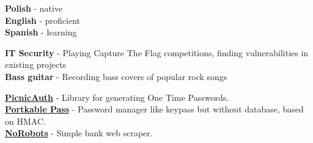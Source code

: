 \documentclass[9pt]{developercv} %
\begin{document}
\begin{minipage}[t]{0.2\textwidth}
	\vspace{-\baselineskip} %


	\textbf{Polish} - native\\
	\textbf{English} - proficient\\
	\textbf{Spanish} - learning
\end{minipage}
\hfill
\begin{minipage}[t]{0.3\textwidth}
	\vspace{-\baselineskip} %


	\textbf{IT Security} - Playing Capture The Flag competitions, finding vulnerabilities in existing projects\\
	\textbf{Bass guitar} - Recording bass covers of popular rock songs
\end{minipage}
\hfill
\begin{minipage}[t]{0.4\textwidth}
	\vspace{-\baselineskip} %


	\textbf{\href{https://github.com/matishadow/PicnicAuth}{PicnicAuth}} - Library for generating One Time Passwords.\\
	\textbf{\href{https://github.com/matishadow/portkable-pass}{Portkable Pass}} - Password manager like keypass but without database, based on HMAC.\\
	\textbf{\href{https://github.com/matishadow/NoRobots}{NoRobots}} - Simple bank web scraper.
\end{minipage}

\end{document}
